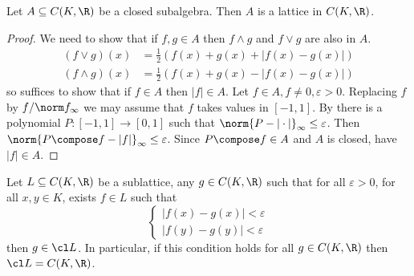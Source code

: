 \documentclass[a4paper]{article}
\begin{document}
\begin{lemma}
  Let \(A \subseteq C(K, \R)\) be a closed subalgebra. Then \(A\) is a lattice in \(C(K, \R)\).
\end{lemma}

\begin{proof}
  We need to show that if \(f, g \in A\) then \(f \wedge g\) and \(f \vee g\) are also in \(A\).
  \begin{align*}
    (f \vee g) (x) &= \frac{1}{2} (f(x) + g(x) + |f(x) - g(x)|) \\
    (f \wedge g) (x) &= \frac{1}{2} (f(x) + g(x) - |f(x) - g(x)|)
  \end{align*}
  so suffices to show that if \(f \in A\) then \(|f| \in A\). Let \(f \in A, f \neq 0, \varepsilon > 0\). Replacing \(f\) by \(f/\norm f_\infty\) we may assume that \(f\) takes values in \([-1, 1]\). By  there is a polynomial \(P: [-1, 1] \to [0, 1]\) such that \(\norm{P - |\cdot|}_\infty \leq \varepsilon\). Then \(\norm{P \compose f - |f|}_\infty \leq \varepsilon\). Since \(P \compose f \in A\) and \(A\) is closed, have \(|f| \in A\).
\end{proof}

\begin{lemma}
  \label{lem:lattice}
  Let \(L \subseteq C(K, \R)\) be a sublattice, any \(g \in C(K, \R)\) such that for all \(\varepsilon > 0\), for all \(x, y \in K\), exists \(f \in L\) such that
  \[
    \label{eqn:lattice}
    \left\{
      \begin{array}{l}
        |f(x) - g(x)| < \varepsilon \\
        |f(y) - g(y)| < \varepsilon
      \end{array}
    \right.
    \tag{\ast}
  \]
  then \(g \in \cl L\). In particular, if this condition holds for all \(g \in C(K, \R)\) then \(\cl L = C(K, \R)\).
\end{lemma}
\end{document}

